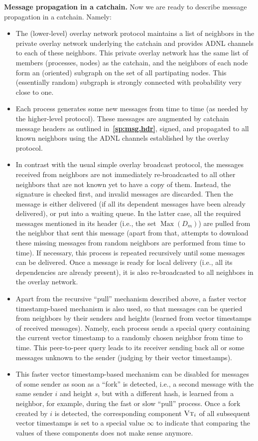 \documentclass[12pt,oneside]{article}
\def\makepoint#1{\medbreak\noindent{\bf #1.\ }}
\def\nxpoint{\refstepcounter{subsection}%
  \smallbreak\makepoint{\thesubsection}}
\def\refpoint#1{{\rm\textbf{\ref{#1}}}}
\let\ptref=\refpoint
\def\emb#1{\textbf{#1.}}
\def\opsc#1{\operatorname{\textsc{#1}}}
\def\Max{\operatorname{Max}}
\def\VT{\opsc{Vt}}
\begin{document}
\nxpoint\emb{Message propagation in a catchain}\label{sp:cc.msg.prop}
Now we are ready to describe message propagation in a catchain. Namely:
\begin{itemize}
\item The (lower-level) overlay network protocol maintains a list of neighbors in the private overlay network underlying the catchain and provides ADNL channels to each of these neighbors. This private overlay network has the same list of members (processes, nodes) as the catchain, and the neighbors of each node form an (oriented) subgraph on the set of all partipating nodes. This (essentially random) subgraph is strongly connected with probability very close to one.
\item Each process generates some new messages from time to time (as needed by the higher-level protocol). These messages are augmented by catchain message headers as outlined in~\ptref{sp:msg.hdr}, signed, and propagated to all known neighbors using the ADNL channels established by the overlay protocol.
\item In contrast with the usual simple overlay broadcast protocol, the messages received from neighbors are not immediately re-broadcasted to all other neighbors that are not known yet to have a copy of them. Instead, the signature is checked first, and invalid messages are discarded. Then the message is either delivered (if all its dependent messages have been already delivered), or put into a waiting queue. In the latter case, all the required messages mentioned in its header (i.e., the set $\Max(D_m)$) are pulled from the neighbor that sent this message (apart from that, attempts to download these missing messages from random neighbors are performed from time to time). If necessary, this process is repeated recursively until some messages can be delivered. Once a message is ready for local delivery (i.e., all its dependencies are already present), it is also re-broadcasted to all neighbors in the overlay network.
\item Apart from the recursive ``pull'' mechanism described above, a faster vector timestamp-based mechanism is also used, so that messages can be queried from neighbors by their senders and heights (learned from vector timestamps of received messages). Namely, each process sends a special query containing the current vector timestamp to a randomly chosen neighbor from time to time. This peer-to-peer query leads to its receiver sending back all or some messages unknown to the sender (judging by their vector timestamps).
\item This faster vector timestamp-based mechanism can be disabled for messages of some sender as soon as a ``fork'' is detected, i.e., a second message with the same sender $i$ and height $s$, but with a different hash, is learned from a neighbor, for example, during the fast or slow ``pull'' process. Once a fork created by $i$ is detected, the corresponding component $\VT_i$ of all subsequent vector timestamps is set to a special value $\infty$ to indicate that comparing the values of these components does not make sense anymore.

\end{itemize}
\end{document}
